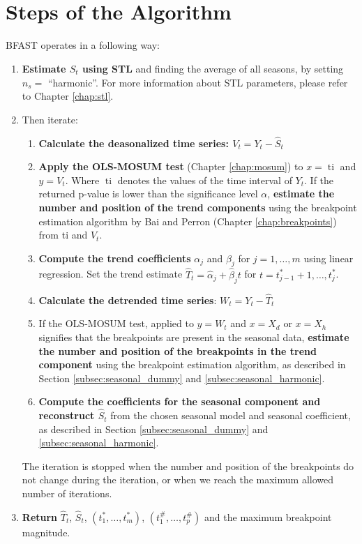 \documentclass[main.tex]{subfiles}
\begin{document}
\section{Steps of the Algorithm}
\label{sec:bfast_algorithm_steps}
BFAST operates in a following way:
\begin{enumerate}
\item \textbf{Estimate $\hat{S}_t$ using STL} and finding the average of all seasons, by
  setting $n_s =$ ``harmonic''. For more information about STL parameters,
  please refer to Chapter \ref{chap:stl}.
\item Then iterate:
  \begin{enumerate}[1)]
    \item \textbf{Calculate the deasonalized time series: $V_t = Y_t - \hat{S}_t$}
    \item \textbf{Apply the OLS-MOSUM test} (Chapter \ref{chap:mosum}) to $x=\operatorname{ti}$ and
      $y = V_t$. Where $\operatorname{ti}$ denotes the values of the time interval of $Y_t$.
      If the returned p-value is lower than the significance level $\alpha$,
      \textbf{estimate the number and position of the trend components} using the
      breakpoint estimation algorithm by Bai and Perron (Chapter
      \ref{chap:breakpoints}) from ti and $V_t$.
    \item \textbf{Compute the trend coefficients} $\alpha_j$ and $\beta_j$ for
      $j = 1, \hdots, m$ using linear regression. Set the trend estimate
      $\hat{T}_t = \hat{\alpha}_j + \hat{\beta}_j t$ for
      $t = t^*_{j-1} + 1, \hdots, t^*_j$.
    \item \textbf{Calculate the detrended time series}: $W_t = Y_t - \hat{T}_t$
    \item If the OLS-MOSUM test, applied to $y=W_t$ and $x = X_{d}$ or $x =X_{h}$
      signifies that the breakpoints are present in the
      seasonal data, \textbf{estimate the number and position of the
      breakpoints in the trend component} using the breakpoint estimation
      algorithm, as described in Section \ref{subsec:seasonal_dummy} and
      \ref{subsec:seasonal_harmonic}.
    \item \textbf{Compute the coefficients for the seasonal component
      and reconstruct $\hat{S}_t$} from the chosen seasonal model and seasonal
      coefficient, as described in Section \ref{subsec:seasonal_dummy} and
      \ref{subsec:seasonal_harmonic}.
  \end{enumerate}
  The iteration is stopped when the number and position of the breakpoints do
  not change during the iteration, or when we reach the maximum allowed number of iterations.
\item \textbf{Return} $\hat{T}_t$, $\hat{S}_t$, $(t_1^*, \hdots, t_m^*)$, $(t_1^{\#}, \hdots, t_p^{\#})$
  and the maximum breakpoint magnitude.
\end{enumerate}
\end{document}
